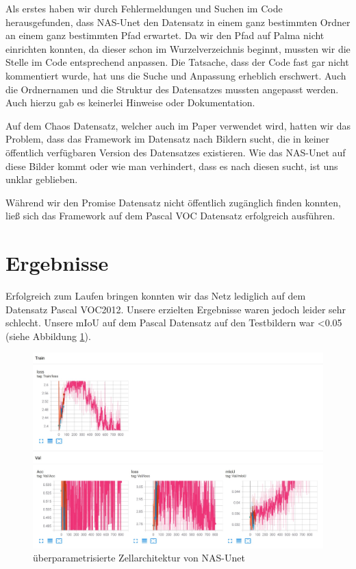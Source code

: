 Als erstes haben wir durch Fehlermeldungen und Suchen im Code herausgefunden, dass NAS-Unet den Datensatz in einem ganz bestimmten Ordner an einem ganz bestimmten Pfad erwartet. Da wir den Pfad auf Palma nicht einrichten konnten, da dieser schon im Wurzelverzeichnis beginnt, mussten wir die Stelle im Code entsprechend anpassen. Die Tatsache, dass der Code fast gar nicht kommentiert wurde, hat uns die Suche und Anpassung erheblich erschwert. Auch die Ordnernamen und die Struktur des Datensatzes mussten angepasst werden. Auch hierzu gab es keinerlei Hinweise oder Dokumentation. 

Auf dem Chaos Datensatz, welcher auch im Paper verwendet wird, hatten wir das Problem, dass das Framework im Datensatz nach Bildern sucht, die in keiner öffentlich verfügbaren Version des Datensatzes \cite{ChaosDatensatz} existieren. Wie das NAS-Unet auf diese Bilder kommt oder wie man verhindert, dass es nach diesen sucht, ist uns unklar geblieben. 

Während wir den Promise Datensatz nicht öffentlich zugänglich finden konnten, ließ sich das Framework auf dem Pascal VOC Datensatz erfolgreich ausführen. 


\section{Ergebnisse}

Erfolgreich zum Laufen bringen konnten wir das Netz lediglich auf dem Datensatz Pascal VOC2012. Unsere erzielten Ergebnisse waren jedoch leider sehr schlecht. Unsere mIoU auf dem Pascal Datensatz auf den Testbildern war <0.05 (siehe Abbildung \ref{pic:nasUnet_Ergebnisse}). 

\begin{figure}[H]
	
	\centering
	\includegraphics[scale=0.25]{Pictures/nasUnet/Bild5.png}
	\caption{überparametrisierte Zellarchitektur von NAS-Unet \cite{nasunetPaper} }
	\label{pic:nasUnet_Ergebnisse}
\end{figure}

